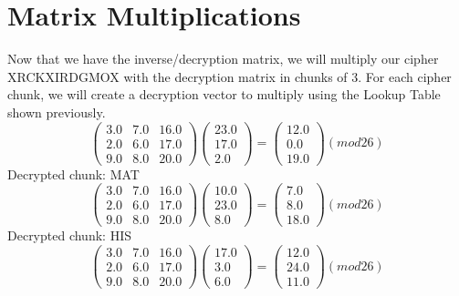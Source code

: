 \documentclass{article}%
\begin{document}
%
\section{Matrix Multiplications}%
\label{sec:MatrixMultiplications}%
Now that we have the inverse/decryption matrix, we will multiply our cipher XRCKXIRDGMOX with the decryption matrix in chunks of 3. For each cipher chunk, we will create a decryption vector to multiply using the Lookup Table shown previously.%
\[%
\begin{pmatrix}%
3.0&7.0&16.0\\%
2.0&6.0&17.0\\%
9.0&8.0&20.0%
\end{pmatrix} \begin{pmatrix}%
23.0\\%
17.0\\%
2.0%
\end{pmatrix} = \begin{pmatrix}%
12.0\\%
0.0\\%
19.0%
\end{pmatrix} (mod26)%
\]%
\newline%
%
Decrypted chunk: MAT%
\[%
\begin{pmatrix}%
3.0&7.0&16.0\\%
2.0&6.0&17.0\\%
9.0&8.0&20.0%
\end{pmatrix} \begin{pmatrix}%
10.0\\%
23.0\\%
8.0%
\end{pmatrix} = \begin{pmatrix}%
7.0\\%
8.0\\%
18.0%
\end{pmatrix} (mod26)%
\]%
\newline%
%
Decrypted chunk: HIS%
\[%
\begin{pmatrix}%
3.0&7.0&16.0\\%
2.0&6.0&17.0\\%
9.0&8.0&20.0%
\end{pmatrix} \begin{pmatrix}%
17.0\\%
3.0\\%
6.0%
\end{pmatrix} = \begin{pmatrix}%
12.0\\%
24.0\\%
11.0%
\end{pmatrix} (mod26)%
\]%
\end{document}
